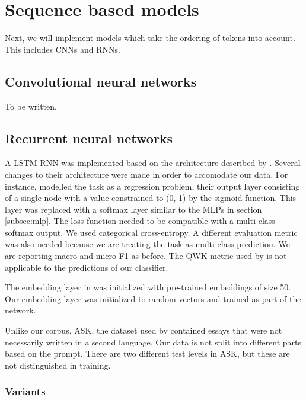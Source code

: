 \chapter{Sequence based models}

Next, we will implement models which take the ordering of tokens into account.
This includes \acp{CNN} and \acp{RNN}. 

\section{Convolutional neural networks}

To be written.

\section{Recurrent neural networks}

A \ac{LSTM} \ac{RNN} was implemented based on the architecture described by
\textcite{taghipour16}. Several changes to their architecture were made in
order to accomodate our data. For instance, \citeauthor{taghipour16} modelled
the task as a regression problem, their output layer consisting of a single
node with a value constrained to (0, 1) by the sigmoid function. This layer
was replaced with a softmax layer similar to the \acp{MLP} in section
\ref{subsec:mlp}. The loss function needed to be compatible with a
multi-class softmax output. We used categorical cross-entropy. A different
evaluation metric was also needed because we are treating the task as
multi-class prediction. We are reporting macro and micro F1 as before. The
\ac{QWK} metric used by \citeauthor{taghipour16} is not applicable to the
predictions of our classifier.

The embedding layer in \textcite{taghipour16} was initialized with
pre-trained embeddings of size 50. Our embedding layer was initialized to
random vectors and trained as part of the network.

Unlike our corpus, ASK, the dataset used by \citeauthor{taghipour16}
contained essays that were not necessarily written in a second language. Our
data is not split into different parts based on the prompt. There are two
different test levels in ASK, but these are not distinguished in training.


\subsection{Variants}

